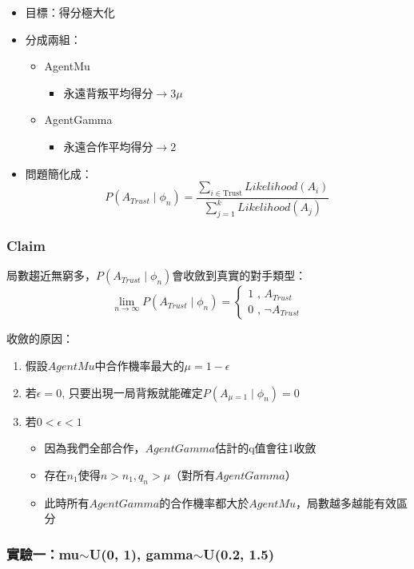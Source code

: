 \documentclass[12pt,a4paper]{beamer}
\begin{document}
\begin{CJK}{UTF8}{bsmi}
\begin{frame}
\begin{itemize}
	\item 目標：得分極大化
	\item 分成兩組：
	\begin{itemize}
		\item AgentMu 
		\begin{itemize}
			\item 永遠背叛平均得分$\rightarrow3\mu$
		\end{itemize}
		\item AgentGamma
		\begin{itemize}
			\item 永遠合作平均得分$\rightarrow2$
		\end{itemize}
	\end{itemize}
	\item 問題簡化成：
$$
P(A_{Trust}\mid \phi_n)
=
\frac
{\sum_{i\in \text{Trust}}Likelihood(A_i)}
{\sum_{j=1}^k Likelihood(A_j)}
$$
\end{itemize}

\end{frame}

\begin{frame}
\frametitle{Claim}

局數趨近無窮多，$P(A_{Trust}\mid \phi_n)$會收斂到真實的對手類型：
$$\lim_{n\to \infty}
P(A_{Trust}\mid \phi_n) = 
\begin{cases}
1\text{ , }A_{Trust} \\ 
0 \text{ , }\neg A_{Trust}
\end{cases}
$$

收斂的原因：
\begin{enumerate}
	\item 假設$AgentMu$中合作機率最大的$\mu=1-\epsilon$
	\item 若$\epsilon=0$, 只要出現一局背叛就能確定$P(A_{\mu=1}\mid \phi_n)=0$
	\item 若$0<\epsilon<1$
	\begin{itemize}
		\item 因為我們全部合作，$AgentGamma$估計的q值會往1收斂
		\item 存在$n_1$使得$n>n_1, q_n>\mu$（對所有$AgentGamma$）
		\item 此時所有$AgentGamma$的合作機率都大於$AgentMu$，局數越多越能有效區分
	\end{itemize}
\end{enumerate}

\end{frame}

\begin{frame}
\frametitle{實驗一：mu$\sim$U(0, 1), gamma$\sim$U(0.2, 1.5)}


\end{frame}
\end{CJK}
\end{document}

